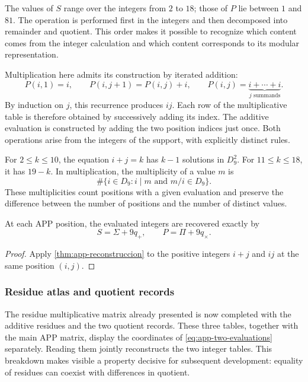 The values of $S$ range over the integers from $2$ to $18$; those of $P$ lie between $1$ and $81$. The operation is performed first in the integers and then decomposed into remainder and quotient. This order makes it possible to recognize which content comes from the integer calculation and which content corresponds to its modular representation.

Multiplication here admits its construction by iterated addition:
\[
 P(i,1)=i,\qquad P(i,j+1)=P(i,j)+i,
 \qquad P(i,j)=\underbrace{i+\cdots+i}_{j\text{ summands}}.
\]
By induction on $j$, this recurrence produces $ij$. Each row of the multiplicative table is therefore obtained by successively adding its index. The additive evaluation is constructed by adding the two position indices just once. Both operations arise from the integers of the support, with explicitly distinct rules.

For $2\leq k\leq10$, the equation $i+j=k$ has $k-1$ solutions in $D_9^2$. For $11\leq k\leq18$, it has $19-k$. In multiplication, the multiplicity of a value $m$ is
\[
 \#\{i\in D_9:i\mid m\text{ and }m/i\in D_9\}.
\]
These multiplicities count positions with a given evaluation and preserve the difference between the number of positions and the number of distinct values.



\begin{bloqueindivisible}
\begin{corolario}
\label{cor:app-evaluaciones-restituidas}
At each APP position, the evaluated integers are recovered exactly by
\begin{equation}
 S=\Sigma+9q_+,
 \qquad P=\Pi+9q_\times.
 \label{eq:app-s-p-lift}
\end{equation}
\end{corolario}

\begin{proof}
Apply \cref{thm:app-reconstruccion} to the positive integers $i+j$ and $ij$ at the same position $(i,j)$.
\end{proof}
\end{bloqueindivisible}

\subsubsection{Residue atlas and quotient records}

The residue multiplicative matrix already presented is now completed with the additive residues and the two quotient records. These three tables, together with the main APP matrix, display the coordinates of \eqref{eq:app-two-evaluations} separately. Reading them jointly reconstructs the two integer tables. This breakdown makes visible a property decisive for subsequent development: equality of residues can coexist with differences in quotient.

